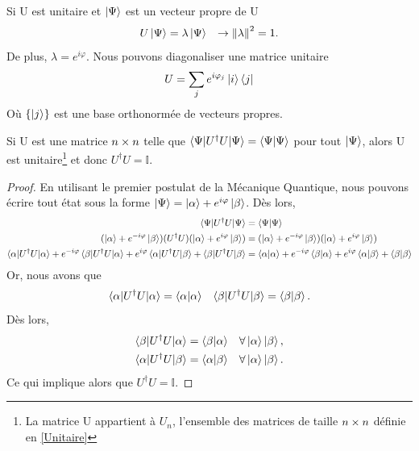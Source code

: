 \documentclass[../notesdecours.tex]{subfiles}
\begin{document}
\begin{Property} Si U est unitaire et $\ket{\Psi}$ est un vecteur propre de U
\begin{align}
U\ket{\Psi} &= \lambda\ket{\Psi}		&\rightarrow \norm{\lambda}^2 = 1.
\end{align}
De plus, $\lambda = e^{i\varphi}$. Nous pouvons diagonaliser une matrice unitaire 
\begin{equation}
U = \sum_j e^{i\varphi_j}\ket{i}\bra{j}
\end{equation}
Où $\{\ket{j}\}$ est une base orthonormée de vecteurs propres. \end{Property}

\begin{theorem}
Si U est une matrice $n\times n$ telle que $\braket{\Psi|U^\dag U|\Psi} = \braket{\Psi|\Psi}$ pour tout $\ket{\Psi}$, alors U est unitaire\footnote{La matrice U appartient à $U_n$, l'ensemble des matrices de taille $n\times n$ définie en \ref{Unitaire}} et donc $U^\dag U = \mathbb{I}$.
\end{theorem}
\begin{proof}
En utilisant le premier postulat de la Mécanique Quantique, nous pouvons écrire tout état sous la forme $\ket{\Psi} = \ket{\alpha} + e^{i\varphi}\ket{\beta}$. Dès lors,
\begin{align*}
\braket{\Psi|U^\dag U|\Psi} &= \braket{\Psi|\Psi}\\
(\ket{\alpha} + e^{-i\varphi}\ket{\beta})(U^\dag U)(\ket{\alpha} + e^{i\varphi}\ket{\beta}) &= (\ket{\alpha} + e^{-i\varphi}\ket{\beta})(\ket{\alpha} + e^{i\varphi}\ket{\beta})\\
\braket{\alpha|U^\dag U|\alpha} + e^{-i\varphi}\braket{\beta|U^\dag U|\alpha} + e^{i\varphi}\braket{\alpha|U^\dag U|\beta} + \braket{\beta|U^\dag U|\beta} &= \braket{\alpha|\alpha} + e^{-i\varphi}\braket{\beta|\alpha} + e^{i\varphi}\braket{\alpha|\beta} + \braket{\beta|\beta}
\end{align*}
Or, nous avons que
\begin{align*}
\braket{\alpha|U^\dag U|\alpha} &= \braket{\alpha|\alpha}		&\braket{\beta|U^\dag U|\beta} = \braket{\beta|\beta}.
\end{align*}
Dès lors, 
\begin{align*}
\braket{\beta|U^\dag U |\alpha} &= \braket{\beta|\alpha}	&\forall\ket{\alpha}\ket{\beta},\\
\braket{\alpha|U^\dag U|\beta} &= \braket{\alpha|\beta}	&\forall\ket{\alpha}\ket{\beta}.
\end{align*}
Ce qui implique alors que $U^\dag U = \mathbb{I}$.
\end{proof}
\end{document}
